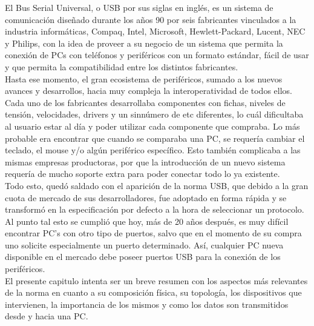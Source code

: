 El Bus Serial Universal, o USB por sus siglas en inglés, es un sistema de comunicación diseñado durante los años 90 por seis fabricantes vinculados a la industria informáticas, Compaq, Intel, Microsoft, Hewlett-Packard, Lucent, NEC y Philips, con la idea de proveer a su negocio de un sistema que permita la conexión de PCs con teléfonos y periféricos con un formato estándar, fácil de usar y que permita la compatibilidad entre los distintos fabricantes.\\

Hasta ese momento, el gran ecosistema de periféricos, sumado a los nuevos avances y desarrollos, hacia muy compleja la interoperatividad de todos ellos. Cada uno de los fabricantes desarrollaba componentes con fichas, niveles de tensión, velocidades, drivers y un sinnúmero de etc diferentes, lo cuál dificultaba al usuario estar al día y poder utilizar cada componente que compraba. Lo más probable era encontrar que cuando se comparaba una PC, se requería cambiar el teclado, el mouse y/o algún periférico específico. Esto también complicaba a las mismas empresas productoras, por que la introducción de un nuevo sistema requería de mucho soporte extra para poder conectar todo lo ya existente.\\

Todo esto, quedó saldado con el aparición de la norma USB, que debido a la gran cuota de mercado de sus desarrolladores, fue adoptado en forma rápida y se transformó en la especificación por defecto a la hora de seleccionar un protocolo. Al punto tal esto se cumplió que hoy, más de 20 años después, es muy difícil encontrar PC's con otro tipo de puertos, salvo que en el momento de su compra uno solicite especialmente un puerto determinado. Así, cualquier PC nueva disponible en el mercado debe poseer puertos USB para la conexión de los periféricos.\\

El presente capitulo intenta ser un breve resumen con los aspectos más relevantes de la norma en cuanto a su composición física, su topología, los dispositivos que intervienen, la importancia de los mismos y como los datos son transmitidos desde y hacia una PC.\\


